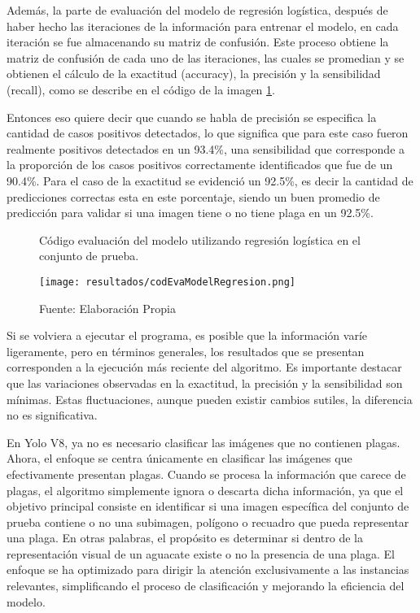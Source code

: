 Además, la parte de evaluación del modelo de regresión logística, después de haber hecho las iteraciones de la información para entrenar el modelo, en cada iteración se fue almacenando su matriz de confusión. Este proceso obtiene la matriz de confusión de cada uno de las iteraciones, las cuales se promedian y se obtienen el cálculo de la exactitud (accuracy), la precisión y la sensibilidad (recall), como se describe en el código de la imagen \ref{fig:figuraCodEvaModelRegresion}. 

Entonces eso quiere decir que cuando se habla de precisión se especifica la cantidad de casos positivos detectados, lo que significa que para este caso fueron realmente positivos detectados en un 93.4\%, una sensibilidad que corresponde a la proporción de los casos positivos correctamente identificados que fue de un 90.4\%. Para el caso de la exactitud se evidenció un 92.5\%, es decir la cantidad de predicciones correctas esta en este porcentaje, siendo un buen promedio de predicción para validar si una imagen tiene o no tiene plaga en un 92.5\%.

\newpage

\begin{figure}[h]
\centering
\caption{Código evaluación del modelo utilizando regresión logística en el conjunto de prueba.}
\texttt{[image: resultados/codEvaModelRegresion.png]}
\caption*{\footnotesize Fuente: Elaboración Propia}
\label{fig:figuraCodEvaModelRegresion}
\end{figure}

Si se volviera a ejecutar el programa, es posible que la información varíe ligeramente, pero en términos generales, los resultados que se presentan corresponden a la ejecución más reciente del algoritmo. Es importante destacar que las variaciones observadas en la exactitud, la precisión y la sensibilidad son mínimas. Estas fluctuaciones, aunque pueden existir cambios sutiles, la diferencia no es significativa.

En Yolo V8, ya no es necesario clasificar las imágenes que no contienen plagas. Ahora, el enfoque se centra únicamente en clasificar las imágenes que efectivamente presentan plagas. Cuando se procesa la información que carece de plagas, el algoritmo simplemente ignora o descarta dicha información, ya que el objetivo principal consiste en identificar si una imagen específica del conjunto de prueba contiene o no una subimagen, polígono o recuadro que pueda representar una plaga. En otras palabras, el propósito es determinar si dentro de la representación visual de un aguacate existe o no la presencia de una plaga. El enfoque se ha optimizado para dirigir la atención exclusivamente a las instancias relevantes, simplificando el proceso de clasificación y mejorando la eficiencia del modelo.


